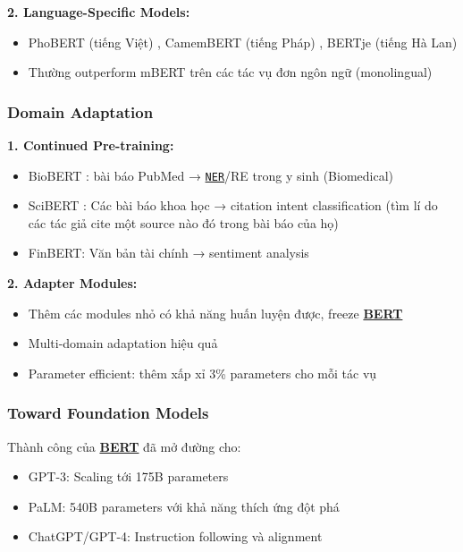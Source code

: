 \textbf{2. Language-Specific Models:}
\begin{itemize}
    \item PhoBERT (tiếng Việt) \cite{nguyen2020phobert}, CamemBERT (tiếng Pháp) \cite{martin2019camembert}, BERTje (tiếng Hà Lan)
    \item Thường outperform mBERT trên các tác vụ đơn ngôn ngữ (monolingual)
\end{itemize}

\subsubsection{Domain Adaptation}

\textbf{1. Continued Pre-training:}
\begin{itemize}
    \item BioBERT \cite{lee2020biobert}: bài báo PubMed → \hyperref[acro:ner]{\texttt{NER}}/RE trong y sinh (Biomedical)
    \item SciBERT \cite{beltagy2019scibert}: Các bài báo khoa học → citation intent classification (tìm lí do các tác giả cite một source nào đó trong bài báo của họ)
    \item FinBERT: Văn bản tài chính → sentiment analysis
\end{itemize}

\textbf{2. Adapter Modules:}
\begin{itemize}
    \item Thêm các modules nhỏ có khả năng huấn luyện được, freeze \hyperref[acro:bert]{\textbf{BERT}}
    \item Multi-domain adaptation hiệu quả
    \item Parameter efficient: thêm xấp xỉ 3\% parameters cho mỗi tác vụ
\end{itemize}

\subsubsection{Toward Foundation Models}
Thành công của \hyperref[acro:bert]{\textbf{BERT}} đã mở đường cho:
\begin{itemize}
    \item GPT-3: Scaling tới 175B parameters
    \item PaLM: 540B parameters với khả năng thích ứng đột phá
    \item ChatGPT/GPT-4: Instruction following và alignment
\end{itemize}

